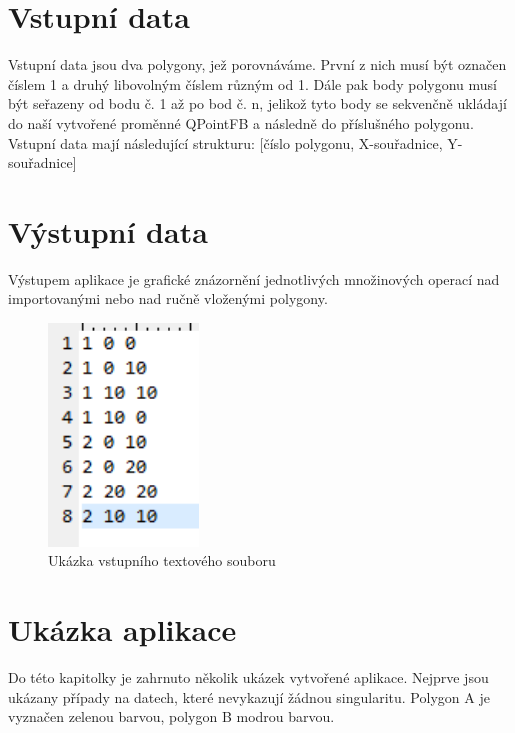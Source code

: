 \documentclass[a4paper,11pt,twoside]{article}
\begin{document}
\newpage
{}

\vspace*{-1cm}
\section{Vstupní data}
Vstupní data jsou dva polygony, jež porovnáváme. První z nich musí být označen číslem 1 a druhý libovolným číslem různým od 1. Dále pak body polygonu musí být seřazeny od bodu č. 1 až po bod č. n, jelikož tyto body se sekvenčně ukládají do naší vytvořené proměnné QPointFB a následně do příslušného polygonu. Vstupní data mají následující strukturu: [číslo polygonu, X-souřadnice, Y-souřadnice]

\section{Výstupní data}
Výstupem aplikace je grafické znázornění jednotlivých množinových operací nad importovanými nebo nad ručně vloženými polygony.

\vspace{0.2cm}
\begin{figure}[hbt!] 
\begin{center}
\includegraphics[width=4cm]{pictures/textak.PNG} 
\caption[Ukázka vstupního textového souboruí]{Ukázka vstupního textového souboru}
\label{fig:textak}
\end{center}
\end{figure}

\newpage
{}

\vspace*{-1cm}
\section{Ukázka aplikace}
\noindent
\large
Do této kapitolky je zahrnuto několik ukázek vytvořené aplikace. Nejprve jsou ukázany případy na datech, které nevykazují žádnou singularitu. Polygon A je vyznačen zelenou barvou, polygon B modrou barvou.
\end{document}
